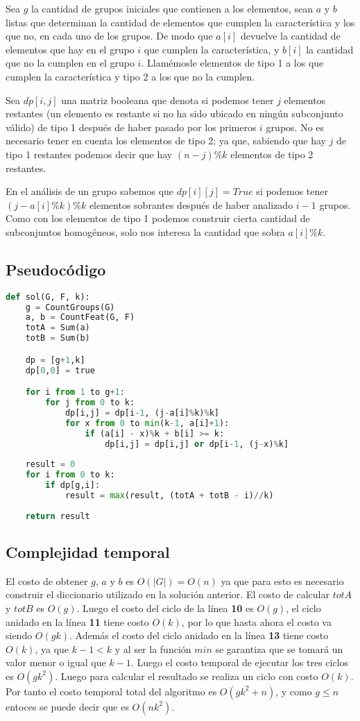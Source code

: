 \documentclass{article}
\begin{document}
Sea $g$ la cantidad de grupos iniciales que contienen a los elementos, 
sean $a$ y $b$ listas que determinan la cantidad de elementos que cumplen
la característica y los que no, en cada uno de los grupos. De modo que $a[i]$ 
devuelve la cantidad de elementos que hay en el grupo $i$ que cumplen la característica,
y $b[i]$ la cantidad que no la cumplen en el grupo $i$.
Llamémosle elementos de tipo 1 a los que cumplen la característica y tipo 2 a los 
que no la cumplen. 

Sea $dp[i,j]$ una matriz booleana que denota si podemos tener $j$ elementos restantes 
(un elemento es restante si no ha sido ubicado en ningún subconjunto válido) 
de tipo 1 después de haber pasado por los primeros $i$ grupos. No es necesario 
tener en cuenta los elementos de tipo 2; ya que, sabiendo que hay $j$ de tipo 1 restantes
podemos decir que hay $(n-j)\%k$ elementos de tipo 2 restantes. 

En el análisis de un grupo sabemos que $dp[i][j] = True$ si podemos tener $(j-a[i]\%k)\%k$
elementos sobrantes después de haber analizado $i-1$ grupos. Como con los elementos de tipo 1 
podemos construir cierta cantidad de subconjuntos homogéneos, solo nos interesa la cantidad que sobra 
$a[i]\%k$.

\subsection*{Pseudocódigo}

\begin{lstlisting}[language = Python]
def sol(G, F, k):
    g = CountGroups(G)
    a, b = CountFeat(G, F)
    totA = Sum(a)
    totB = Sum(b)

    dp = [g+1,k]
    dp[0,0] = true

    for i from 1 to g+1:
        for j from 0 to k:
            dp[i,j] = dp[i-1, (j-a[i]%k)%k]
            for x from 0 to min(k-1, a[i]+1):
                if (a[i] - x)%k + b[i] >= k:
                    dp[i,j] = dp[i,j] or dp[i-1, (j-x)%k]
    
    result = 0
    for i from 0 to k:
        if dp[g,i]:
            result = max(result, (totA + totB - i)//k)
    
    return result
\end{lstlisting}

\subsection*{Complejidad temporal}
El costo de obtener $g$, $a$ y $b$ es $O(|G|) = O(n)$ ya que para esto es necesario construir 
el diccionario utilizado en la solución anterior. El costo de calcular $totA$ y  $totB$ es $O(g)$. 
Luego el costo del ciclo de la línea \textbf{10} es $O(g)$, el ciclo anidado en la línea \textbf{11} 
tiene costo $O(k)$, por lo que hasta ahora el costo va siendo $O(gk)$. Además 
el costo del ciclo anidado en la línea \textbf{13} tiene costo $O(k)$, ya que 
$k-1 < k$ y al ser la función $min$ se garantiza que se tomará un valor menor
o igual que $k-1$. Luego el costo temporal de ejecutar los tres ciclos es $O(gk^2)$.
Luego para calcular el resultado se realiza un ciclo con costo $O(k)$.
Por tanto el costo temporal total del algoritmo es $O(gk^2 + n)$, y como $g \leq n$ entoces
se puede decir que es $O(nk^2)$.
\end{document}
